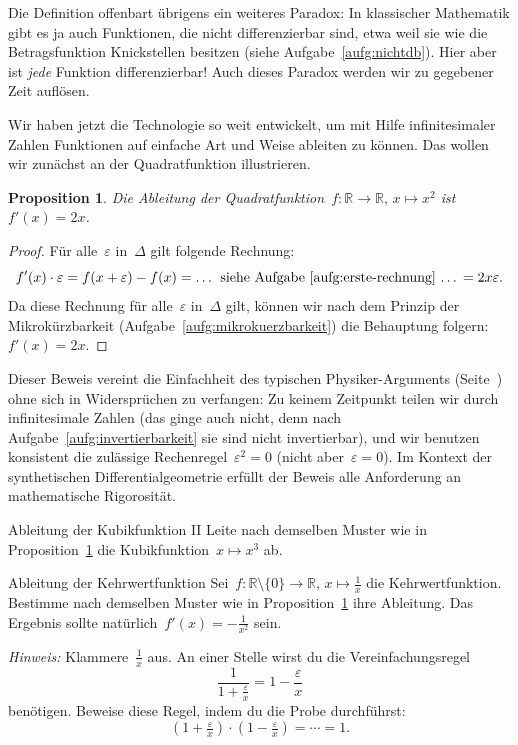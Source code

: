 \documentclass{zirkelblatt}
\newcommand{\RR}{\mathbb{R}}
\theoremstyle{definition}
\theoremstyle{plain}
\newtheorem{prop}[defn]{Proposition}
\theoremstyle{remark}
\begin{document}
Die\marginpar[\hfill\dbend]{\dbend} Definition offenbart übrigens ein weiteres Paradox: In klassischer
Mathematik gibt es ja auch Funktionen, die nicht differenzierbar sind, etwa
weil sie wie die Betragsfunktion Knickstellen besitzen (siehe
Aufgabe~\ref{aufg:nichtdb}). Hier aber ist \emph{jede}
Funktion differenzierbar! Auch dieses Paradox werden wir zu gegebener Zeit
auflösen.

Wir haben jetzt die Technologie so weit entwickelt, um mit Hilfe
infinitesimaler Zahlen Funktionen auf einfache Art und Weise ableiten zu
können. Das wollen wir zunächst an der Quadratfunktion illustrieren.

\begin{prop}\label{prop:ableitung-quadratfunktion-sdg}
Die Ableitung der Quadratfunktion~$f : \RR \to \RR,\,x \mapsto x^2$
ist~$f'(x) = 2x$.\end{prop}
\begin{proof}Für alle~$\varepsilon$ in~$\Delta$ gilt folgende Rechnung:
\[ f'(x) \cdot \varepsilon =
  f(x + \varepsilon) - f(x) =
  \text{\ldots{} siehe Aufgabe~\ref{aufg:erste-rechnung} \ldots} =
  2x\varepsilon. \]
Da diese Rechnung für alle~$\varepsilon$ in~$\Delta$ gilt, können wir nach dem
Prinzip der Mikrokürzbarkeit (Aufgabe~\ref{aufg:mikrokuerzbarkeit}) die
Behauptung folgern: $f'(x) = 2x$.
\end{proof}

Dieser Beweis vereint die Einfachheit des typischen Physiker-Arguments
(Seite~\pageref{par:schizophren}) ohne sich in Widersprüchen zu verfangen: Zu
keinem Zeitpunkt teilen wir durch infinitesimale Zahlen (das ginge auch nicht,
denn nach Aufgabe~\ref{aufg:invertierbarkeit} sie sind nicht invertierbar), und
wir benutzen konsistent die zulässige Rechenregel~$\varepsilon^2 = 0$ (nicht
aber~$\varepsilon = 0$). Im Kontext der synthetischen Differentialgeometrie
erfüllt der Beweis alle Anforderung an mathematische Rigorosität.

\begin{aufgabeShaded}{Ableitung der Kubikfunktion II}
Leite nach demselben Muster wie in
Proposition~\ref{prop:ableitung-quadratfunktion-sdg} die Kubikfunktion~$x
\mapsto x^3$ ab.
\end{aufgabeShaded}

\begin{aufgabeShaded}{Ableitung der Kehrwertfunktion}
Sei~$f : \RR \setminus \{0\} \to \RR,\,x \mapsto \frac{1}{x}$ die
Kehrwertfunktion. Bestimme nach demselben Muster wie in
Proposition~\ref{prop:ableitung-quadratfunktion-sdg} ihre Ableitung.
Das Ergebnis sollte natürlich~$f'(x) = -\frac{1}{x^2}$ sein.

\emph{Hinweis:} Klammere~$\frac{1}{x}$ aus. An einer Stelle wirst du die Vereinfachungsregel
\[ \frac{1}{1 + \frac{\varepsilon}{x}} = 1 - \frac{\varepsilon}{x} \]
benötigen.\footnotemark{}
Beweise diese Regel, indem du die Probe durchführst:
\[ (1 + \tfrac{\varepsilon}{x}) \cdot (1 - \tfrac{\varepsilon}{x}) = \cdots = 1. \]
\end{aufgabeShaded}
\end{document}
